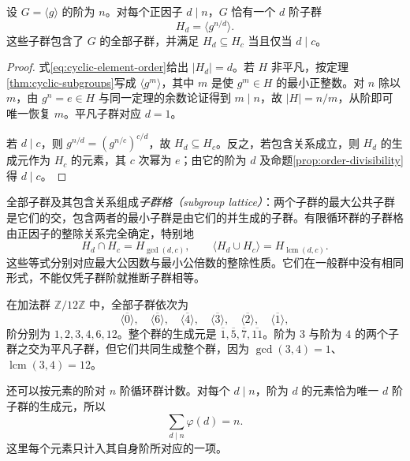 \begin{theorem}[有限循环群的子群分类]\label{thm:finite-cyclic-subgroups}
设 $G=\langle g\rangle$ 的阶为 $n$。对每个正因子 $d\mid n$，$G$ 恰有一个 $d$ 阶子群
\begin{equation}\label{eq:cyclic-subgroup-divisor}
  H_d=\langle g^{n/d}\rangle.
\end{equation}
这些子群包含了 $G$ 的全部子群，并满足 $H_d\subseteq H_c$ 当且仅当 $d\mid c$。
\end{theorem}
\begin{proof}
式\eqref{eq:cyclic-element-order}给出 $|H_d|=d$。若 $H$ 非平凡，按定理\ref{thm:cyclic-subgroups}写成 $\langle g^m\rangle$，其中 $m$ 是使 $g^m\in H$ 的最小正整数。对 $n$ 除以 $m$，由 $g^n=e\in H$ 与同一定理的余数论证得到 $m\mid n$，故 $|H|=n/m$，从阶即可唯一恢复 $m$。平凡子群对应 $d=1$。

若 $d\mid c$，则 $g^{n/d}=(g^{n/c})^{c/d}$，故 $H_d\subseteq H_c$。反之，若包含关系成立，则 $H_d$ 的生成元作为 $H_c$ 的元素，其 $c$ 次幂为 $e$；由它的阶为 $d$ 及命题\ref{prop:order-divisibility}得 $d\mid c$。
\end{proof}

全部子群及其包含关系组成\emph{子群格（subgroup lattice）}：两个子群的最大公共子群是它们的交，包含两者的最小子群是由它们的并生成的子群。有限循环群的子群格由正因子的整除关系完全确定，特别地
\[
  H_d\cap H_c=H_{\gcd(d,c)},\qquad
  \langle H_d\cup H_c\rangle=H_{\operatorname{lcm}(d,c)}.
\]
这些等式分别对应最大公因数与最小公倍数的整除性质。它们在一般群中没有相同形式，不能仅凭子群阶就推断子群相等。

\begin{example}[十二阶循环群]
在加法群 $\mathbb Z/12\mathbb Z$ 中，全部子群依次为
\[
  \langle\overline0\rangle,\quad\langle\overline6\rangle,\quad
  \langle\overline4\rangle,\quad\langle\overline3\rangle,\quad
  \langle\overline2\rangle,\quad\langle\overline1\rangle,
\]
阶分别为 $1,2,3,4,6,12$。整个群的生成元是 $\overline1,\overline5,\overline7,\overline{11}$。阶为 $3$ 与阶为 $4$ 的两个子群之交为平凡子群，但它们共同生成整个群，因为 $\gcd(3,4)=1$、$\operatorname{lcm}(3,4)=12$。
\end{example}

还可以按元素的阶对 $n$ 阶循环群计数。对每个 $d\mid n$，阶为 $d$ 的元素恰为唯一 $d$ 阶子群的生成元，所以
\begin{equation}\label{eq:totient-divisor-sum}
  \sum_{d\mid n}\varphi(d)=n.
\end{equation}
这里每个元素只计入其自身阶所对应的一项。

